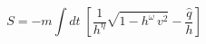 \begin{equation}
    S = - m \int dt \; \left[ \frac{1}{h^{\eta}}
    \sqrt{1 - h^\omega \, v^2} - \frac{\hat{q}}{h} \right]
\end{equation}


